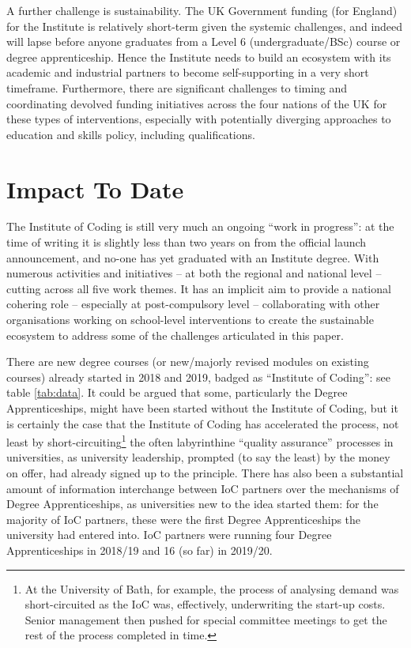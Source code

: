 \documentclass[conference]{IEEEtran}
\begin{document}
A further challenge is sustainability. The UK Government funding (for
England) for the Institute is relatively short-term given the systemic
challenges, and indeed will lapse before anyone graduates from a Level
6 (undergraduate/BSc) course or degree apprenticeship. Hence the
Institute needs to build an ecosystem with its academic and industrial
partners to become self-supporting in a very short
timeframe. Furthermore, there are significant challenges to timing and
coordinating devolved funding initiatives across the four nations of
the UK for these types of interventions, especially with potentially
diverging approaches to education and skills policy, including qualifications.

\section{Impact To Date}\label{impact}

The Institute of Coding is still very much an ongoing ``work in
progress'': at the time of writing it is slightly less than two years
on from the official launch announcement, and no-one has yet graduated
with an Institute degree.  With numerous activities and initiatives --
at both the regional and national level -- cutting across all five
work themes. It has an implicit aim to provide a national cohering
role -- especially at post-compulsory level -- collaborating with
other organisations working on school-level interventions to create
the sustainable ecosystem to address some of the challenges
articulated in this paper.

There are new degree courses (or new/majorly revised modules on
existing courses) already started in 2018 and 2019, badged as
``Institute of Coding'': see table \ref{tab:data}.  It could be argued
that some, particularly the Degree Apprenticeships, might have been
started without the Institute of Coding, but it is certainly the case
that the Institute of Coding has accelerated the process, not least by
short-circuiting\footnote{At the University of Bath, for example, the process of
analysing demand was short-circuited as the IoC was, effectively,
underwriting the start-up costs. Senior management then pushed for
special committee meetings to get the rest of the process completed in
time.} the often labyrinthine ``quality assurance'' processes in
universities, as university leadership, prompted (to say the least) by
the money on offer, had already signed up to the principle. There has
also been a substantial amount of information interchange between IoC
partners over the mechanisms of Degree Apprenticeships, as
universities new to the idea started them: for the majority of IoC
partners, these were the first Degree Apprenticeships the university
had entered into. IoC partners were running four Degree Apprenticeships
in 2018/19 and 16 (so far) in 2019/20.
\end{document}
